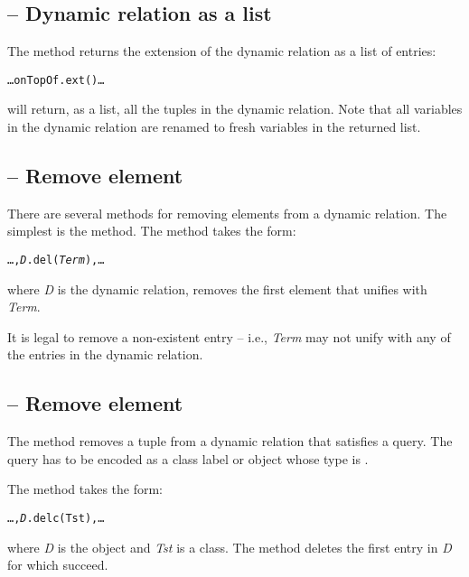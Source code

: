 \subsection{ -- Dynamic relation as a list}
\label{dynamic:ext}
The  method returns the extension of the dynamic relation as a list of entries:
\begin{alltt}
\ldots{}onTopOf.ext()\ldots
\end{alltt}
will return, as a list, all the tuples in the  dynamic relation. Note that all variables in the dynamic relation are renamed to fresh variables in the returned list.

\subsection{ -- Remove element}
\label{dynamic:del}
There are several methods for removing elements from a dynamic relation. The simplest is the  method. The  method takes the form:
\begin{alltt}
\ldots,\emph{D}.del(\emph{Term}),\ldots
\end{alltt}
where \emph{D} is the dynamic relation, removes the first element that unifies with \emph{Term}.

It is legal to remove a non-existent entry -- i.e., \emph{Term} may not unify with any of the entries in the dynamic relation.
 
\subsection{ -- Remove element}
\label{dynamic:delc}
The  method removes a tuple from a dynamic relation that satisfies a query. The query has to be encoded as a class label or object whose type is .

The  method takes the form:
\begin{alltt}
\ldots,\emph{D}.delc(Tst),\ldots
\end{alltt}
where \emph{D} is the  object and \emph{Tst} is a  class. The  method deletes the first entry in \emph{D} for which  succeed.

